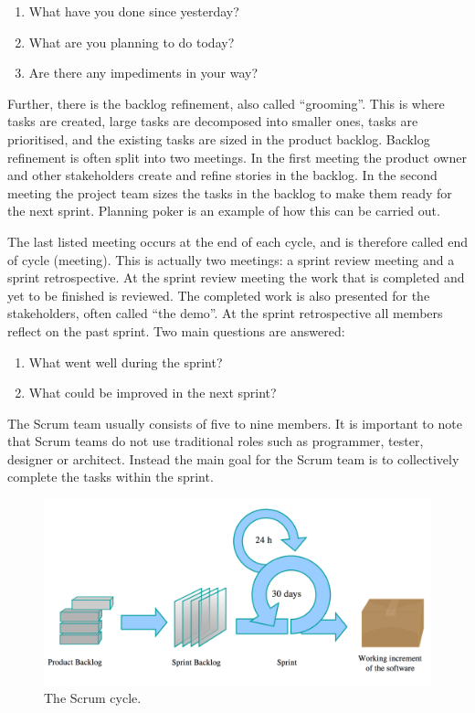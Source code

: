 \begin{enumerate}
  \item What have you done since yesterday?
  \item What are you planning to do today?
  \item Are there any impediments in your way?
\end{enumerate}

Further, there is the backlog refinement, also called ``grooming''. This is where tasks are created, large tasks are decomposed into smaller ones, tasks are prioritised, and the existing tasks are sized in the product backlog. Backlog refinement is often split into two meetings. In the first meeting the product owner and other stakeholders create and refine stories in the backlog. In the second meeting the project team sizes the tasks in the backlog to make them ready for the next sprint. Planning poker is an example of how this can be carried out.

The last listed meeting occurs at the end of each cycle, and is therefore called end of cycle (meeting). This is actually two meetings: a sprint review meeting and a sprint retrospective. At the sprint review meeting the work that is completed and yet to be finished is reviewed. The completed work is also presented for the stakeholders, often called  ``the demo''. At the sprint retrospective all members reflect on the past sprint. Two main questions are answered:

\begin{enumerate}
  \item What went well during the sprint?
  \item What could be improved in the next sprint?
\end{enumerate}

The Scrum team usually consists of five to nine members. It is important to note that Scrum teams do not use traditional roles such as programmer, tester, designer or architect. Instead the main goal for the Scrum team is to collectively complete the tasks within the sprint.

\begin{figure}
\centering
\includegraphics[width=\textwidth]{images/chapters/development_models/Scrum.png}
\caption{The Scrum cycle.}
\label{scrum}
\end{figure}

